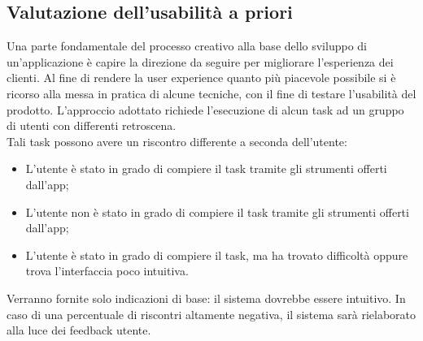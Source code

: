 \documentclass{natourDoc}
\begin{document}
\subsection{Valutazione dell'usabilità a priori}
Una parte fondamentale del processo creativo alla base dello sviluppo di un'applicazione è capire la direzione da seguire per migliorare l’esperienza dei clienti.
Al fine di rendere la user experience quanto più piacevole possibile si è ricorso alla messa in pratica di alcune tecniche, con il fine di testare l’usabilità del prodotto.
L’approccio adottato richiede l'esecuzione di alcun task ad un gruppo di utenti con differenti retroscena. \\

Tali task possono avere un riscontro differente a seconda dell'utente:
\begin{itemize}
	\item L’utente è stato in grado di compiere il task tramite gli strumenti offerti dall’app;
	\item L’utente non è stato in grado di compiere il task tramite gli strumenti offerti dall’app;
	\item L'utente è stato in grado di compiere il task, ma ha trovato difficoltà oppure trova l'interfaccia poco intuitiva.
\end{itemize}

Verranno fornite solo indicazioni di base: il sistema dovrebbe essere intuitivo. In caso di una percentuale di riscontri altamente
negativa, il sistema sarà rielaborato alla luce dei feedback utente.
\end{document}
